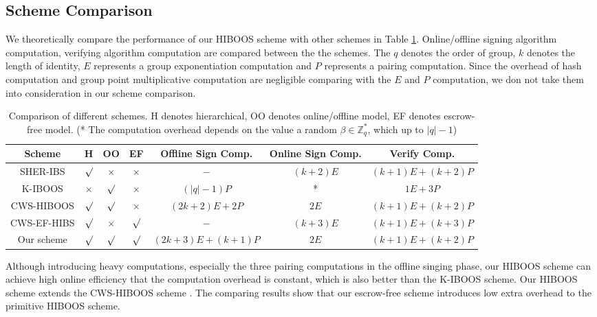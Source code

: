 \documentclass[times]{secauth}
\theoremstyle{definition}
\theoremstyle{remark}
\begin{document}
\subsection{Scheme Comparison}
We theoretically compare the performance of our HIBOOS scheme with other schemes in Table \ref{table-performance}. 
Online/offline signing algorithm computation, verifying algorithm computation are compared between the the schemes.
The $q$ denotes the order of group, $k$ denotes the length of identity, $E$ represents a group exponentiation computation and $P$ represents a pairing computation.
Since the overhead of hash computation and group point multiplicative computation are negligible comparing with the $E$ and $P$ computation, we don not take them into consideration in our scheme comparison. 
\par

\begin{table}
\centering
\caption{\label{table-performance} Comparison of different schemes. H denotes hierarchical, OO denotes online/offline model, EF denotes escrow-free model. (* The computation overhead depends on the value a random  $\beta \in \mathbb{Z}^*_q$, which up to $\left|q\right| -1$)}
\begin{tabular}{|c|c|c|c|c|c|c|}
\hline
Scheme &H &OO &EF &Offline Sign Comp. &Online Sign Comp. &Verify Comp.\\
\hline
\hline
SHER-IBS \cite{chow2004secure} &$\surd$ &$\times$ &$\times$ &$-$ &$(k+2)E$ &$(k+1)E+(k+2)P$ \\
\hline
K-IBOOS \cite{kar2014provably} &$\times$ &$\surd$ &$\times$ &$(\left| q\right| -1)P$ &* &$1E+3P$ \\
\hline
CWS-HIBOOS\cite{chen2015ahiboos} &$\surd$ &$\surd$ &$\times$ &$(2k+2)E+2P$ &$2E$ &$(k+1)E+(k+2)P$ \\
\hline
CWS-EF-HIBS\cite{anescrowfree2015chen} &$\surd$ &$\times$ &$\surd$ &$-$ &$(k+3)E$ &$(k+1)E+(k+3)P$ \\
\hline
Our scheme &$\surd$ &$\surd$ &$\surd$ &$(2k+3)E+(k+1)P$ &$2E$ &$(k+1)E+(k+2)P$ \\
\hline
\end{tabular}
\end{table}

Although introducing heavy computations, especially the three pairing computations in the offline singing phase, our HIBOOS scheme can achieve high online efficiency that the computation overhead is constant, which is also better than the K-IBOOS scheme.
Our HIBOOS scheme extends the CWS-HIBOOS scheme \cite{chen2015ahiboos}.
The comparing results show that our escrow-free scheme introduces low extra overhead to the primitive HIBOOS scheme.  
\par
\end{document}
